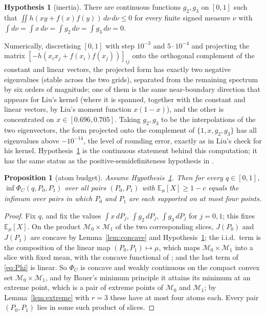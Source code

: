 \documentclass[11pt,a4paper]{article}
\newtheorem{proposition}[theorem]{Proposition}
\theoremstyle{definition}
\newtheorem{hypothesis}[theorem]{Hypothesis}
\theoremstyle{remark}
\newcommand{\E}{\mathbb{E}}
\newcommand{\cM}{\mathcal{M}}
\newcommand{\ent}{h}
\begin{document}
\begin{hypothesis}[inertia]\label{hyp:inertia}
There are continuous functions $g_2,g_3$ on $[0,1]$ such that $\iint\ent(xy+f(x)f(y))\,d\nu\,d\nu\le0$ for every finite signed measure $\nu$ with $\int d\nu=\int x\,d\nu=\int g_2\,d\nu=\int g_3\,d\nu=0$.
\end{hypothesis}
Numerically, discretising $[0,1]$ with step $10^{-3}$ and $5\cdot10^{-4}$ and projecting the matrix $[-\ent(x_ix_j+f(x_i)f(x_j))]_{ij}$ onto the orthogonal complement of the constant and linear vectors, the projected form has exactly two negative eigenvalues (stable across the two grids), separated from the remaining spectrum by six orders of magnitude; one of them is the same near-boundary direction that appears for Liu's kernel (where it is spanned, together with the constant and linear vectors, by Liu's moment function $x(1-x)$), and the other is concentrated on $x\in[0.696,0.705]$. Taking $g_2,g_3$ to be the interpolations of the two eigenvectors, the form projected onto the complement of $\{1,x,g_2,g_3\}$ has all eigenvalues above $-10^{-14}$, the level of rounding error, exactly as in Liu's check for his kernel. Hypothesis~\ref{hyp:inertia} is the continuous statement behind this computation; it has the same status as the positive-semidefiniteness hypothesis in \cite[Theorem~13]{Liu}.

\begin{proposition}[atom budget]\label{prop:atoms}
Assume Hypothesis~\ref{hyp:inertia}. Then for every $q\in[0,1]$, $\inf\Phi_C(q,P_0,P_1)$ over all pairs $(P_0,P_1)$ with $\E_\mu[X]\ge1-c$ equals the infimum over pairs in which $P_0$ and $P_1$ are each supported on at most four points.
\end{proposition}
\begin{proof}
Fix $q$, and fix the values $\int x\,dP_j$, $\int g_2\,dP_j$, $\int g_3\,dP_j$ for $j=0,1$; this fixes $\E_\mu[X]$. On the product $\cM_0\times\cM_1$ of the two corresponding slices, $J(P_0)$ and $J(P_1)$ are concave by Lemma~\ref{lem:concave} and Hypothesis~\ref{hyp:inertia}; the i.i.d.\ term is the composition of the linear map $(P_0,P_1)\mapsto\mu$, which maps $\cM_0\times\cM_1$ into a slice with fixed mean, with the concave functional of \cite[Lemma~5]{AHS}; and the last term of \eqref{eq:Phi} is linear. So $\Phi_C$ is concave and weakly continuous on the compact convex set $\cM_0\times\cM_1$, and by Bauer's minimum principle it attains its minimum at an extreme point, which is a pair of extreme points of $\cM_0$ and $\cM_1$; by Lemma~\ref{lem:extreme} with $r=3$ these have at most four atoms each. Every pair $(P_0,P_1)$ lies in some such product of slices.
\end{proof}
\end{document}
